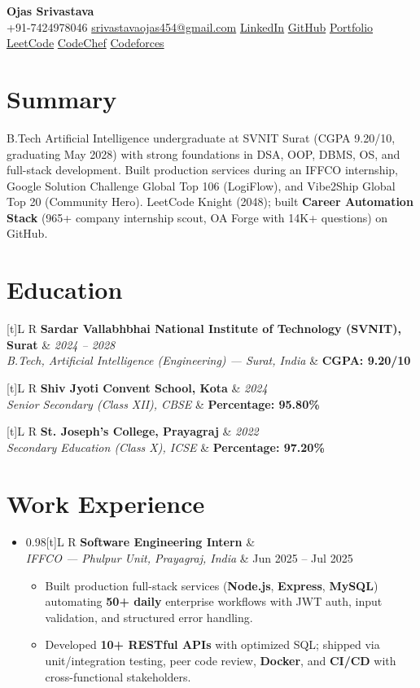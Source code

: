 \documentclass[a4paper,10pt]{article}
\newcommand{\resumeEdu}[4]{%
  \noindent\begin{tabularx}{\textwidth}[t]{L R}%
    \textbf{#1} & \textit{\footnotesize #2} \\%
    \textit{\footnotesize #3} & \textbf{\footnotesize #4} \\%
  \end{tabularx}\vspace{-0.5mm}%
}
\newcommand{\resumeSubheading}[4]{%
  \vspace{0.5mm}\item
  \begin{tabularx}{0.98\textwidth}[t]{L R}%
    \textbf{#1} & \textit{\footnotesize #4} \\%
    \textit{\footnotesize #3} & \footnotesize #2 \\%
  \end{tabularx}\vspace{-2.5mm}%
}
\newcommand{\resumeSubHeadingListStart}{\begin{itemize}[leftmargin=*,labelsep=0mm]}
\newcommand{\resumeSubHeadingListEnd}{\end{itemize}\vspace{-1mm}}
\newcommand{\resumeItemListStart}{\begin{justify}\begin{itemize}[leftmargin=3ex, rightmargin=2ex, noitemsep,labelsep=1.2mm,itemsep=0mm]\small}
\newcommand{\resumeItemListEnd}{\end{itemize}\end{justify}\vspace{-2mm}}
\begin{document}
\selectfont

\begin{center}
  {\LARGE \textbf{Ojas Srivastava}} \\[0.5mm]
  \small
  +91-7424978046 \textbar{}
  \href{mailto:srivastavaojas454@gmail.com}{srivastavaojas454@gmail.com} \textbar{}
  \href{https://linkedin.com/in/ojas-srivastava05}{LinkedIn} \textbar{}
  \href{https://github.com/Ojas-Srivastava05}{GitHub} \textbar{}
  \href{https://ojas-srivastava.vercel.app}{Portfolio} \\[0.5mm]
  \href{https://leetcode.com/Oju_Srivastava}{LeetCode} \textbar{}
  \href{https://www.codechef.com/users/ojassrivastava}{CodeChef} \textbar{}
  \href{https://codeforces.com/profile/Oju}{Codeforces}
\end{center}

\vspace{-2mm}

\section{Summary}
\begin{justify}\small
B.Tech Artificial Intelligence undergraduate at SVNIT Surat (CGPA 9.20/10, graduating May 2028) with strong foundations in DSA, OOP, DBMS, OS, and full-stack development. Built production services during an IFFCO internship, Google Solution Challenge Global Top 106 (LogiFlow), and Vibe2Ship Global Top 20 (Community Hero). LeetCode Knight (2048); built \textbf{Career Automation Stack} (965+ company internship scout, OA Forge with 14K+ questions) on GitHub.
\end{justify}

\section{Education}
\small
\resumeEdu
  {Sardar Vallabhbhai National Institute of Technology (SVNIT), Surat}
  {2024 -- 2028}
  {B.Tech, Artificial Intelligence (Engineering) --- Surat, India}
  {CGPA: 9.20/10}
\resumeEdu
  {Shiv Jyoti Convent School, Kota}
  {2024}
  {Senior Secondary (Class XII), CBSE}
  {Percentage: 95.80\%}
\resumeEdu
  {St. Joseph's College, Prayagraj}
  {2022}
  {Secondary Education (Class X), ICSE}
  {Percentage: 97.20\%}

\section{Work Experience}
\resumeSubHeadingListStart
  \resumeSubheading
    {Software Engineering Intern}{Jun 2025 -- Jul 2025}
    {IFFCO --- Phulpur Unit, Prayagraj, India}{}
    \resumeItemListStart
      \item Built production full-stack services (\textbf{Node.js}, \textbf{Express}, \textbf{MySQL}) automating \textbf{50+ daily} enterprise workflows with JWT auth, input validation, and structured error handling.
      \item Developed \textbf{10+ RESTful APIs} with optimized SQL; shipped via unit/integration testing, peer code review, \textbf{Docker}, and \textbf{CI/CD} with cross-functional stakeholders.
    \resumeItemListEnd
\resumeSubHeadingListEnd
\end{document}
